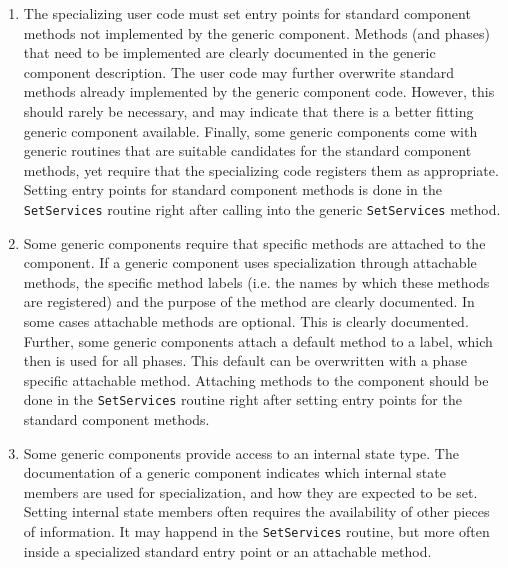 \begin{enumerate}

\item The specializing user code must set entry points for standard component methods not implemented by the generic component. Methods (and phases) that need to be implemented are clearly documented in the generic component description. The user code may further overwrite standard methods already implemented by the generic component code. However, this should rarely be necessary, and may indicate that there is a better fitting generic component available. Finally, some generic components come with generic routines that are suitable candidates for the standard component methods, yet require that the specializing code registers them as appropriate. Setting entry points for standard component methods is done in the {\tt SetServices} routine right after calling into the generic {\tt SetServices} method.

\item Some generic components require that specific methods are attached to the component. If a generic component uses specialization through attachable methods, the specific method labels (i.e. the names by which these methods are registered) and the purpose of the method are clearly documented. In some cases attachable methods are optional. This is clearly documented. Further, some generic components attach a default method to a label, which then is used for all phases. This default can be overwritten with a phase specific attachable method. Attaching methods to the component should be done in the {\tt SetServices} routine right after setting entry points for the standard component methods.

\item Some generic components provide access to an internal state type. The documentation of a generic component indicates which internal state members are used for specialization, and how they are expected to be set. Setting internal state members often requires the availability of other pieces of information. It may happend in the {\tt SetServices} routine, but more often inside a specialized standard entry point or an attachable method.

\end{enumerate}

